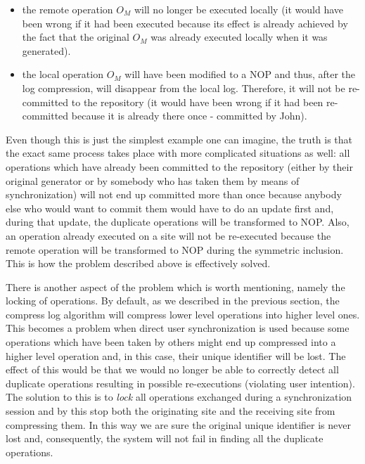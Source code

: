 \begin{itemize}
\item the remote operation $O_{M}$ will no longer be executed locally (it would have been wrong if it
      had been executed because its effect is already achieved by the fact that the original $O_{M}$ was
      already executed locally when it was generated).
\item the local operation $O_{M}$ will have been modified to a NOP and thus, after the log compression,
      will disappear from the local log. Therefore, it will not be re-committed to the repository (it
      would have been wrong if it had been re-committed because it is already there once - committed by
      John).
\end{itemize}

Even though this is just the simplest example one can imagine, the truth is that the exact same process
takes place with more complicated situations as well: all operations which have already been committed
to the repository (either by their original generator or by somebody who has taken them by means of
synchronization) will not end up committed more than once because anybody else who would want to commit
them would have to do an update first and, during that update, the duplicate operations will be transformed
to NOP. Also, an operation already executed on a site will not be re-executed because the remote operation
will be transformed to NOP during the symmetric inclusion. This is how the problem described above is
effectively solved.

There is another aspect of the problem which is worth mentioning, namely the locking of operations. By
default, as we described in the previous section, the compress log algorithm will compress lower level
operations into higher level ones. This becomes a problem when direct user synchronization is used because
some operations which have been taken by others might end up compressed into a higher level operation and,
in this case, their unique identifier will be lost. The effect of this would be that we would no longer
be able to correctly detect all duplicate operations resulting in possible re-executions (violating user
intention). The solution to this is to \emph{lock} all operations exchanged during a synchronization
session and by this stop both the originating site and the receiving site from compressing them. In this
way we are sure the original unique identifier is never lost and, consequently, the system will not
fail in finding all the duplicate operations.

